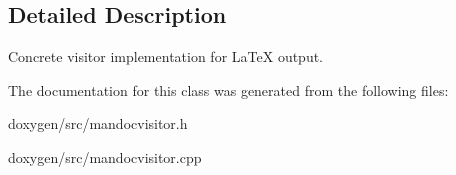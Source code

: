 \subsection{Detailed Description}
Concrete visitor implementation for La\+TeX output. 

The documentation for this class was generated from the following files\+:\begin{DoxyCompactItemize}
\item 
doxygen/src/mandocvisitor.\+h\item 
doxygen/src/mandocvisitor.\+cpp\end{DoxyCompactItemize}
